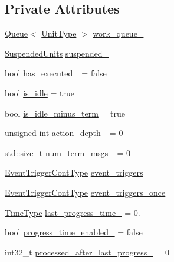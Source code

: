 \subsection*{Private Attributes}
\begin{DoxyCompactItemize}
\item 
\hyperlink{structvt_1_1sched_1_1_queue}{Queue}$<$ \hyperlink{structvt_1_1sched_1_1_scheduler_a398229f29b0940cea85aba4bae78b0be}{Unit\+Type} $>$ \hyperlink{structvt_1_1sched_1_1_scheduler_a8176bae441897c36b86e3fb917496a7a}{work\+\_\+queue\+\_\+}
\item 
\hyperlink{structvt_1_1sched_1_1_suspended_units}{Suspended\+Units} \hyperlink{structvt_1_1sched_1_1_scheduler_a8d3ae065d92642e3b8cf928307c29369}{suspended\+\_\+}
\item 
bool \hyperlink{structvt_1_1sched_1_1_scheduler_ad67cd334d571ced5aa2ae2ffc6a8bec3}{has\+\_\+executed\+\_\+} = false
\item 
bool \hyperlink{structvt_1_1sched_1_1_scheduler_a99754f7b43db03bf0c67ae64d99c86ff}{is\+\_\+idle} = true
\item 
bool \hyperlink{structvt_1_1sched_1_1_scheduler_ad8e195a880684117d7cbb988488c36ef}{is\+\_\+idle\+\_\+minus\+\_\+term} = true
\item 
unsigned int \hyperlink{structvt_1_1sched_1_1_scheduler_a2cd57a3a421320e22d3ee8a6d47eb19e}{action\+\_\+depth\+\_\+} = 0
\item 
std\+::size\+\_\+t \hyperlink{structvt_1_1sched_1_1_scheduler_a4c70a87a9b15558a6ed628272a1db0fd}{num\+\_\+term\+\_\+msgs\+\_\+} = 0
\item 
\hyperlink{structvt_1_1sched_1_1_scheduler_a68203230dc48285d3d50bbb363ed267b}{Event\+Trigger\+Cont\+Type} \hyperlink{structvt_1_1sched_1_1_scheduler_a1f4ed72508099a9959a861f75e37f334}{event\+\_\+triggers}
\item 
\hyperlink{structvt_1_1sched_1_1_scheduler_a68203230dc48285d3d50bbb363ed267b}{Event\+Trigger\+Cont\+Type} \hyperlink{structvt_1_1sched_1_1_scheduler_a6bd19949bf8d905ea48f59ed544f6424}{event\+\_\+triggers\+\_\+once}
\item 
\hyperlink{namespacevt_a876a9d0cd5a952859c72de8a46881442}{Time\+Type} \hyperlink{structvt_1_1sched_1_1_scheduler_aba043e8bb57963e7a490376a06d0c96d}{last\+\_\+progress\+\_\+time\+\_\+} = 0.
\item 
bool \hyperlink{structvt_1_1sched_1_1_scheduler_a0eba67280dfcfb4d1e612e4cf15b8c4b}{progress\+\_\+time\+\_\+enabled\+\_\+} = false
\item 
int32\+\_\+t \hyperlink{structvt_1_1sched_1_1_scheduler_a826e82af9529a9f2dd087e4b8c14be9d}{processed\+\_\+after\+\_\+last\+\_\+progress\+\_\+} = 0

\end{DoxyCompactItemize}
